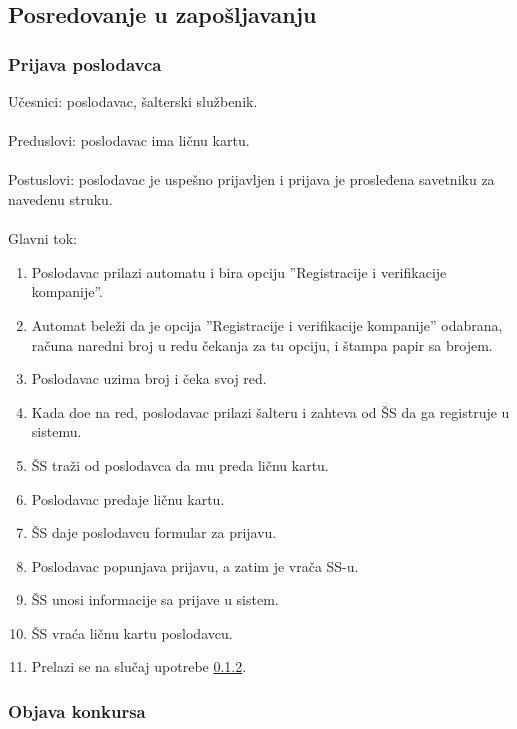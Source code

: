 \subsection{Posredovanje u zapo\v sljavanju}

\subsubsection{Prijava poslodavca}

\noindent Učesnici: poslodavac, šalterski službenik.
\\
\\ Preduslovi: poslodavac ima ličnu kartu.
\\
\\ Postuslovi: poslodavac je uspešno prijavljen i prijava je prosleđena savetniku za navedenu struku.
\\
\\ Glavni tok:
\begin{enumerate}
\item Poslodavac prilazi automatu i bira opciju ''Registracije i verifikacije kompanije''.
	\item Automat bele\v zi da je opcija ''Registracije i verifikacije kompanije'' odabrana, ra\v cuna naredni broj u redu \v cekanja za tu opciju, i \v stampa papir sa brojem.
	\item Poslodavac uzima broj i \v ceka svoj red.
	\item Kada do\dj e na red, poslodavac prilazi \v salteru i zahteva od \v SS da ga registruje u sistemu.
	\item \v SS tra\v zi od poslodavca da mu preda li\v cnu kartu.
	\item Poslodavac predaje ličnu kartu. 
	\item \v SS daje poslodavcu formular za prijavu.
    \item Poslodavac popunjava prijavu, a zatim je vra\v ca SS-u.
	\item \v SS unosi informacije sa prijave u sistem.
	\item \v SS vra\' ca ličnu kartu poslodavcu.
	\item Prelazi se na slu\v caj upotrebe \ref{su: razgovor sa poslodavcem}.
\end{enumerate}



\subsubsection{Objava konkursa}
\label{su: razgovor sa poslodavcem}

